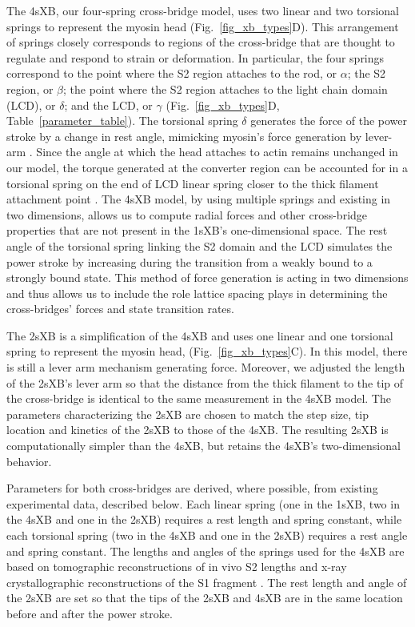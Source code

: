\documentclass[]{article}
\begin{document}
The 4sXB, our four-spring cross-bridge model, uses two linear and two torsional springs to represent the myosin head (Fig.~\ref{fig_xb_types}D).
This arrangement of springs closely corresponds to regions of the cross-bridge that are thought to regulate and respond to strain or deformation. 
In particular, the four springs correspond to the point where the S2 region attaches to the rod, or $\alpha$; the S2 region, or $\beta$; the point where the S2 region attaches to the light chain domain (LCD), or $\delta$; and the LCD, or $\gamma$ (Fig.~\ref{fig_xb_types}D, Table~\ref{parameter_table}). 
The torsional spring $\delta$ generates the force of the power stroke by a change in rest angle, mimicking myosin's force generation by lever-arm \citep{Houdusse2000, Houdusse2001}. 
Since the angle at which the head attaches to actin remains unchanged in our model, the torque generated at the converter region can be accounted for in a torsional spring on the end of LCD linear spring closer to the thick filament attachment point \citep{Houdusse2000}. 
The 4sXB model, by using multiple springs and existing in two dimensions,  allows us to compute radial forces and other cross-bridge properties that are not present in the 1sXB's one-dimensional space. 
The rest angle of the torsional spring linking the S2 domain and the LCD simulates the power stroke by increasing during the transition from a weakly bound to a strongly bound state.
This method of force generation is acting in two dimensions and thus allows us to include the role lattice spacing plays in determining the cross-bridges' forces and state transition rates.

The 2sXB is a simplification of the 4sXB and uses one linear and one torsional spring to represent the myosin head, (Fig.~\ref{fig_xb_types}C).
In this model, there is still a lever arm mechanism generating force.  
Moreover, we adjusted the length of the 2sXB's lever arm so that the distance from the thick filament to the tip of the cross-bridge is identical to the same measurement in the 4sXB model.
The parameters characterizing the 2sXB are chosen to match the step size, tip location and kinetics of the 2sXB to those of the 4sXB\@. 
The resulting 2sXB is computationally simpler than the 4sXB, but retains the 4sXB's two-dimensional behavior.

Parameters for both cross-bridges are derived, where possible, from existing experimental data, described below.  
Each linear spring (one in the 1sXB, two in the 4sXB and one in the 2sXB) requires a rest length and spring constant, while each torsional spring (two in the 4sXB and one in the 2sXB) requires a rest angle and spring constant.
The lengths and angles of the springs used for the 4sXB are based on tomographic reconstructions of in vivo S2 lengths and x-ray crystallographic reconstructions of the S1 fragment \citep{Taylor1999, Rayment1993}.
The rest length and angle of the 2sXB are set so that the tips of the 2sXB and 4sXB are in the same location before and after the power stroke.
\end{document}
